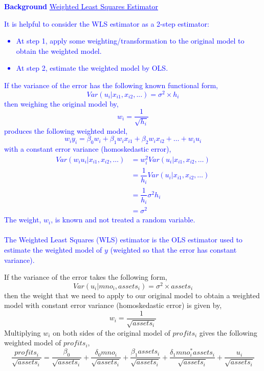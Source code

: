 \documentclass[12pt]{report}
\newenvironment{blueframed}[1][blue]
{\def\FrameCommand{\fboxsep=\FrameSep\fcolorbox{#1}{white}}%
\MakeFramed {\advance\hsize-\width \FrameRestore}}
{\endMakeFramed}
\begin{document}
\justify
\begin{blueframed}
	\textcolor{blue}{\textbf{Background}}
	\vspace{-\baselineskip}
	\justify
	\textcolor{blue}{\underline{Weighted Least Squares Estimator}}
	
	\noindent \textcolor{blue}
	{
		\noindent It is helpful to consider the WLS estimator as a 2-step estimator: \begin{itemize}
			\item At step 1, apply some weighting/transformation to the original model to obtain the weighted model.
			\item At step 2, estimate the weighted model by OLS.
		\end{itemize} If the variance of the error has the following known functional form,
		$$Var(u_i|x_{i1},x_{i2},...) = \sigma^2 \times h_i$$
		\noindent then weighing the original model by,
		$$w_i = \dfrac{1}{\sqrt{h_i}}$$
		\noindent produces the following weighted model, $$w_iy_i = \beta_0w_i + \beta_1w_ix_{i1} + \beta_2w_ix_{i2} + \dots + w_iu_i$$ with a constant error variance 		(homoskedastic error),
		\begin{align*}
		Var(w_iu_i|x_{i1},x_{i2},\dots) &= w^2_iVar(u_i|x_{i1},x_{i2},\dots) \\
		&= \dfrac{1}{h_i}Var(u_i|x_{i1},x_{i2},\dots) \\
		&= \dfrac{1}{h_i}\sigma^2h_i \\
		&= \sigma^2
		\end{align*}
		The weight, $w_i$, is known and not treated a random variable. \\ \\ The Weighted Least Squares (WLS) estimator is the OLS estimator used to estimate the weighted model of $y$ (weighted so that the error has constant variance).
	}
\end{blueframed}

\noindent If the variance of the error takes the following form,
$$Var(u_i|mno_i, assets_i) = \sigma^2 \times assets_i$$
\noindent then the weight that we need to apply to our original model to obtain a weighted model with constant error variance (homoskedastic error) is given by,
$$w_i = \dfrac{1}{\sqrt{assets_i}}$$
\noindent Multiplying $w_i$ on both sides of the original model of $profits_i$ gives the following weighted model of $profits_i$,
$$\dfrac{profits_i}{\sqrt{assets_i}} = \dfrac{\beta_0}{\sqrt{assets_i}} + \dfrac{\delta_0mno_i}{\sqrt{assets_i}} + \dfrac{\beta_1assets_i}{\sqrt{assets_i}} + \dfrac{\delta_1mno_i^*assets_i}{\sqrt{assets_i}} + \dfrac{u_i}{\sqrt{assets_i}}$$
\end{document}
